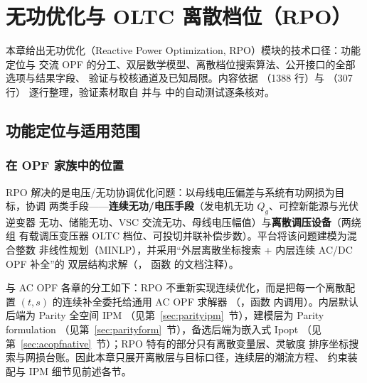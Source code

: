 \section{无功优化与 OLTC 离散档位（RPO）}\label{sec:rpo}

本章给出无功优化（Reactive Power Optimization, RPO）模块的技术口径：功能定位与
交流 OPF 的分工、双层数学模型、离散档位搜索算法、公开接口的全部选项与结果字段、
验证与校核通道及已知局限。内容依据
（1388 行）与
（307 行）
逐行整理，验证素材取自
 并与
 中的自动测试逐条核对。

\subsection{功能定位与适用范围}


\subsubsection*{在 OPF 家族中的位置}
RPO 解决的是电压/无功协调优化问题：以母线电压偏差与系统有功网损为目标，协调
两类手段——\textbf{连续无功/电压手段}（发电机无功 $Q_g$、可控新能源与光伏逆变器
无功、储能无功、VSC 交流无功、母线电压幅值）与\textbf{离散调压设备}（两绕组
有载调压变压器 OLTC 档位、可投切并联补偿步数）。平台将该问题建模为混合整数
非线性规划（MINLP），并采用“外层离散坐标搜索 + 内层连续 AC/DC OPF 补全”的
双层结构求解（，
函数  的文档注释）。

与 AC OPF 各章的分工如下：RPO 不重新实现连续优化，而是把每一个离散配置
$(t,s)$ 的连续补全委托给通用 AC OPF 求解器 
（，函数
 内调用）。内层默认后端为 Parity 全空间 IPM
（见第~\ref{sec:parityipm}~节），建模层为 Parity formulation
（见第~\ref{sec:parityform}~节），备选后端为嵌入式 Ipopt
（见第~\ref{sec:acopfnative}~节）；RPO 特有的部分只有离散变量层、灵敏度
排序坐标搜索与网损台账。因此本章只展开离散层与目标口径，连续层的潮流方程、
约束装配与 IPM 细节见前述各节。

